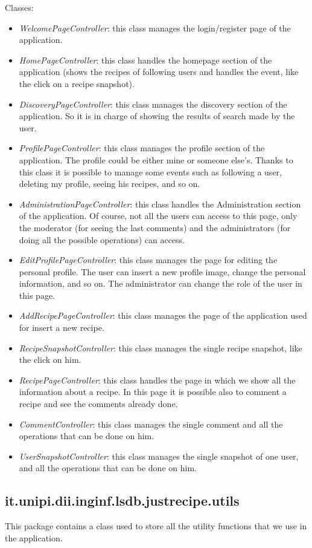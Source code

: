 \documentclass[a4paper]{report}
\begin{document}
\noindent Classes:
 \begin{itemize}
	\item \emph{WelcomePageController}: this class manages the login/register page of the application.
	\item \emph{HomePageController}: this class handles the homepage section of the application (shows the recipes of following users and handles the event, like the click on a recipe snapshot).
	\item \emph{DiscoveryPageController}: this class manages the discovery section of the application. So it is in charge of showing the results of search made by the user.
	\item \emph{ProfilePageController}: this class manages the profile section of the application. The profile could be either mine or someone else's. Thanks to this class it is possible to manage some events such as following a user, deleting my profile, seeing his recipes, and so on.
	\item \emph{AdministrationPageController}: this class handles the Administration section of the application. Of course, not all the users can access to this page, only the moderator (for seeing the last comments) and the administrators (for doing all the possible operations) can access.
	\item \emph{EditProfilePageController}: this class manages the page for editing the personal profile. The user can insert a new profile image, change the personal information, and so on. The administrator can change the role of the user in this page.
	\item \emph{AddRecipePageController}: this class manages the page of the application used for insert a new recipe. 
	\item \emph{RecipeSnapshotController}: this class manages the single recipe snapshot, like the click on him.
	\item \emph{RecipePageController}: this class handles the page in which we show all the information about a recipe. In this page it is possible also to comment a recipe and see the comments already done.
	\item \emph{CommentController}: this class manages the single comment and all the operations that can be done on him.
	\item \emph{UserSnapshotController}: this class manages the single snapshot of one user, and all the operations that can be done on him.
\end{itemize}
\subsection {it.unipi.dii.inginf.lsdb.justrecipe.utils}
This package contains a class used to store all the utility functions that we use in the application.
\end{document}
